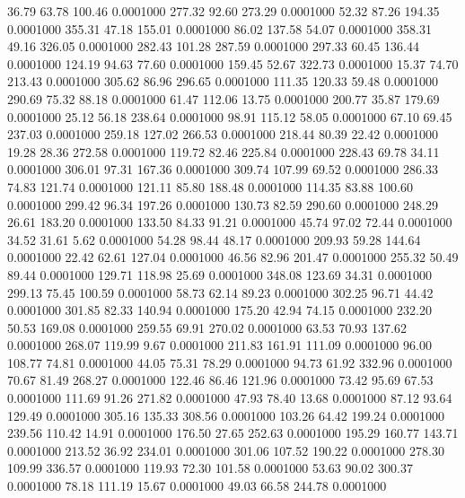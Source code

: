   36.79   63.78  100.46   0.0001000
 277.32   92.60  273.29   0.0001000
  52.32   87.26  194.35   0.0001000
 355.31   47.18  155.01   0.0001000
  86.02  137.58   54.07   0.0001000
 358.31   49.16  326.05   0.0001000
 282.43  101.28  287.59   0.0001000
 297.33   60.45  136.44   0.0001000
 124.19   94.63   77.60   0.0001000
 159.45   52.67  322.73   0.0001000
  15.37   74.70  213.43   0.0001000
 305.62   86.96  296.65   0.0001000
 111.35  120.33   59.48   0.0001000
 290.69   75.32   88.18   0.0001000
  61.47  112.06   13.75   0.0001000
 200.77   35.87  179.69   0.0001000
  25.12   56.18  238.64   0.0001000
  98.91  115.12   58.05   0.0001000
  67.10   69.45  237.03   0.0001000
 259.18  127.02  266.53   0.0001000
 218.44   80.39   22.42   0.0001000
  19.28   28.36  272.58   0.0001000
 119.72   82.46  225.84   0.0001000
 228.43   69.78   34.11   0.0001000
 306.01   97.31  167.36   0.0001000
 309.74  107.99   69.52   0.0001000
 286.33   74.83  121.74   0.0001000
 121.11   85.80  188.48   0.0001000
 114.35   83.88  100.60   0.0001000
 299.42   96.34  197.26   0.0001000
 130.73   82.59  290.60   0.0001000
 248.29   26.61  183.20   0.0001000
 133.50   84.33   91.21   0.0001000
  45.74   97.02   72.44   0.0001000
  34.52   31.61    5.62   0.0001000
  54.28   98.44   48.17   0.0001000
 209.93   59.28  144.64   0.0001000
  22.42   62.61  127.04   0.0001000
  46.56   82.96  201.47   0.0001000
 255.32   50.49   89.44   0.0001000
 129.71  118.98   25.69   0.0001000
 348.08  123.69   34.31   0.0001000
 299.13   75.45  100.59   0.0001000
  58.73   62.14   89.23   0.0001000
 302.25   96.71   44.42   0.0001000
 301.85   82.33  140.94   0.0001000
 175.20   42.94   74.15   0.0001000
 232.20   50.53  169.08   0.0001000
 259.55   69.91  270.02   0.0001000
  63.53   70.93  137.62   0.0001000
 268.07  119.99    9.67   0.0001000
 211.83  161.91  111.09   0.0001000
  96.00  108.77   74.81   0.0001000
  44.05   75.31   78.29   0.0001000
  94.73   61.92  332.96   0.0001000
  70.67   81.49  268.27   0.0001000
 122.46   86.46  121.96   0.0001000
  73.42   95.69   67.53   0.0001000
 111.69   91.26  271.82   0.0001000
  47.93   78.40   13.68   0.0001000
  87.12   93.64  129.49   0.0001000
 305.16  135.33  308.56   0.0001000
 103.26   64.42  199.24   0.0001000
 239.56  110.42   14.91   0.0001000
 176.50   27.65  252.63   0.0001000
 195.29  160.77  143.71   0.0001000
 213.52   36.92  234.01   0.0001000
 301.06  107.52  190.22   0.0001000
 278.30  109.99  336.57   0.0001000
 119.93   72.30  101.58   0.0001000
  53.63   90.02  300.37   0.0001000
  78.18  111.19   15.67   0.0001000
  49.03   66.58  244.78   0.0001000
